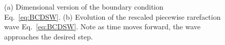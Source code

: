 \documentclass{jfm}
\begin{document}
\begin{figure}
    \centering
    \caption{(a) Dimensional version of the boundary condition Eq.~\ref{eq:BCDSW}. (b) Evolution of the rescaled piecewise rarefaction wave Eq.~\ref{eq:BCDSW}. Note as time moves forward, the wave approaches the desired step.}
    \label{fig:rare_wave_inv}
\end{figure}
\end{document}
